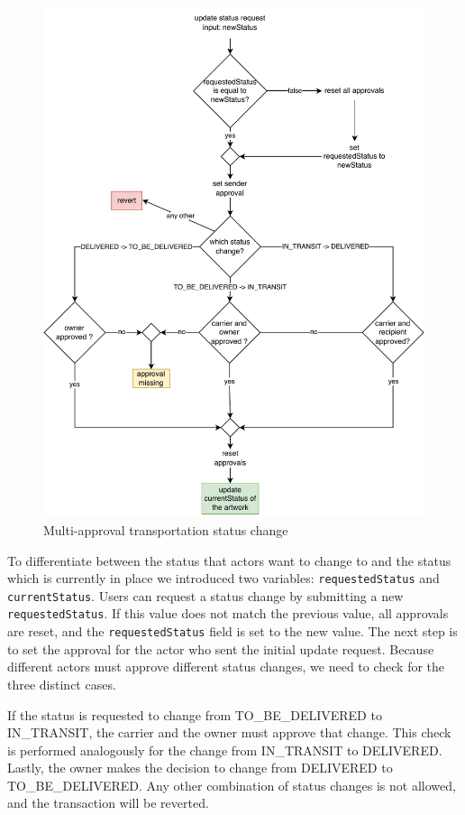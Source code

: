 \begin{figure}[ht]
    \centering
    \includegraphics[height=0.5\textheight, keepaspectratio]{diagrams/update_status.drawio.pdf}
    \caption{Multi-approval transportation status change}
    \label{fig:update_status}
\end{figure}

To differentiate between the status that actors want to change to and the status which is currently in place we introduced two variables: \texttt{requestedStatus} and \texttt{currentStatus}. Users can request a status change by submitting a new \texttt{requestedStatus}. If this value does not match the previous value, all approvals are reset, and the \texttt{requestedStatus} field is set to the new value. The next step is to set the approval for the actor who sent the initial update request. Because different actors must approve different status changes, we need to check for the three distinct cases.

If the status is requested to change from TO\_BE\_DELIVERED to IN\_TRANSIT, the carrier and the owner must approve that change. This check is performed analogously for the change from IN\_TRANSIT to DELIVERED. Lastly, the owner makes the decision to change from DELIVERED to TO\_BE\_DELIVERED. Any other combination of status changes is not allowed, and the transaction will be reverted.

